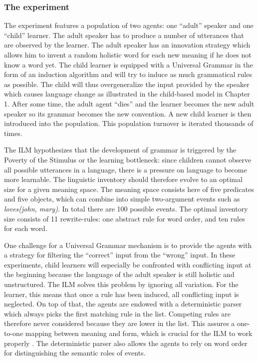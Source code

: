 \subsubsection{The experiment}
The experiment features a population of two agents: one ``adult'' speaker and one ``child'' learner. The adult speaker has to produce a number of utterances that are observed by the learner. The adult speaker has an innovation strategy which allows him to invent a random holistic word for each new meaning if he does not know a word yet. The child learner is equipped with a Universal Grammar in the form of an induction algorithm and will try to induce as much grammatical rules as possible. The child will thus overgeneralize the input provided by the speaker which causes language change as illustrated in the child-based model in Chapter 1. After some time, the adult agent ``dies'' and the learner becomes the new adult speaker so its grammar becomes the new convention. A new child learner is then introduced into the population. This population turnover is iterated thousands of times.

The ILM hypothesizes that the development of grammar is triggered by the Poverty of the Stimulus or the learning bottleneck: since children cannot observe all possible utterances in a language, there is a pressure on language to become more learnable. The linguistic inventory should therefore evolve to an optimal size for a given meaning space. The meaning space consists here of five predicates and five objects, which can combine into simple two-argument events such as {\em loves(john, mary)}. In total there are 100 possible events. The optimal inventory size consists of 11 rewrite-rules: one abstract rule for word order, and ten rules for each word.

One challenge for a Universal Grammar mechanism is to provide the agents with a strategy for filtering the ``correct'' input from the ``wrong'' input. In these experiments, child learners will especially be confronted with conflicting input at the beginning because the language of the adult speaker is still holistic and unstructured. The ILM solves this problem by ignoring all variation. For the learner, this means that once a rule has been induced, all conflicting input is neglected. On top of that, the agents are endowed with a deterministic parser which always picks the first matching rule in the list. Competing rules are therefore never considered because they are lower in the list. This assures a one-to-one mapping between meaning and form, which is crucial for the ILM to work properly \citep{smith03transmission}. The deterministic parser also allows the agents to rely on word order for distinguishing the semantic roles of events.


